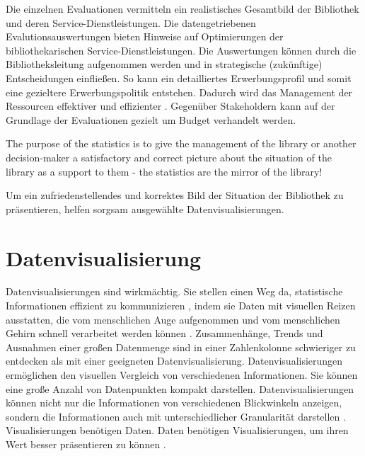 Die einzelnen Evaluationen vermitteln ein realistisches Gesamtbild der Bibliothek und deren Service-Dienstleistungen. 
Die datengetriebenen Evalutionsauswertungen bieten Hinweise auf Optimierungen der bibliothekarischen Service-Dienstleistungen. 
Die Auswertungen können durch die Bibliotheksleitung aufgenommen werden und in strategische (zukünftige) Entscheidungen einfließen. 
So kann ein detailliertes Erwerbungsprofil und somit eine gezieltere Erwerbungspolitik entstehen. 
Dadurch wird das Management der Ressourcen effektiver und effizienter \cite[vgl.][297]{johnson_peggy_fundamentals_2014}.
Gegenüber Stakeholdern kann auf der Grundlage der Evaluationen gezielt um Budget verhandelt werden.
\begin{displayquote}
    The purpose of the statistics is to give the management of the library or another decision-maker 
    a satisfactory and correct picture about the situation of the library as a support to them - the statistics are the mirror of the library!
    \cite[463]{laitinen_markku_library_2013}
\end{displayquote}

Um ein zufriedenstellendes und korrektes Bild der Situation der Bibliothek zu präsentieren, helfen sorgsam ausgewählte Datenvisualisierungen.



\clearpage
\section{Datenvisualisierung}
\label{chap:two_two}
Datenvisualisierungen sind wirkmächtig. Sie stellen einen Weg da, statistische Informationen effizient zu kommunizieren \cite[vgl.][15]{Tufte01}, 
indem sie Daten mit visuellen Reizen ausstatten, die vom menschlichen Auge aufgenommen und vom menschlichen Gehirn schnell verarbeitet werden können \cite[vgl.][32]{few_now_2009}. 
Zusammenhänge, Trends und Ausnahmen einer großen Datenmenge sind in einer Zahlenkolonne schwieriger zu entdecken als mit einer geeigneten Datenvisualisierung.
Datenvisualisierungen ermöglichen den visuellen Vergleich von verschiedenen Informationen. Sie können  eine große Anzahl von Datenpunkten kompakt darstellen. 
Datenvisualisierungen können nicht nur die Informationen von verschiedenen Blickwinkeln anzeigen, sondern die Informationen auch
mit unterschiedlicher Granularität darstellen \cite[vgl.][245]{muller_business_2013}.
Visualisierungen benötigen Daten. Daten benötigen Visualisierungen, um ihren Wert besser präsentieren zu können \cite[vgl.][16]{kirk_data_2019}.


